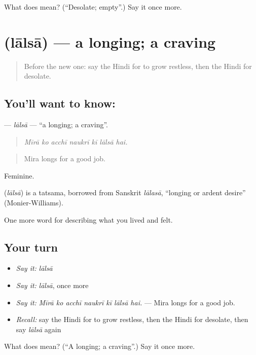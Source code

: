 \begin{tcolorbox}[breakable,colback=teal!4,colframe=teal!35!black,title={Before you move on}]
What does  mean? (\textquotedblleft{}Desolate; empty\textquotedblright{}.) Say it once more.
\end{tcolorbox}
\section[\texorpdfstring{\hi{लालसा} (lālsā)}{लालसा (lālsā)}]{ (lālsā) — a longing; a craving}

\label{lesson:HI-C460-lalsa}



\begin{quote}
Before the new one: say the Hindi for to grow restless, then the Hindi for desolate.
\end{quote}

\subsection*{You'll want to know: }
\textbf{} — \emph{lālsā} — \textquotedblleft{}a longing; a craving\textquotedblright{}.

\begin{quote}
      
\end{quote}

\begin{quote}
\emph{Mīrā ko acchī naukrī kī lālsā hai.}
\end{quote}

\begin{quote}
Mira longs for a good job.
\end{quote}

Feminine.

\begin{cousinweb}
\textbf{} (\emph{lālsā}) is a tatsama, borrowed from Sanskrit \emph{lālasā}, \textquotedblleft{}longing or ardent desire\textquotedblright{} (Monier-Williams).
\end{cousinweb}

\begin{grammarlens}[title={What you've built}]
One more word for describing what you lived and felt.
\end{grammarlens}

\subsection*{Your turn}
\begin{itemize}
\raggedright
  \item \emph{Say it:} \emph{lālsā}
  \item \emph{Say it:} \emph{lālsā}, once more
  \item \emph{Say it:} \emph{Mīrā ko acchī naukrī kī lālsā hai.} — Mira longs for a good job.
  \item \emph{Recall:} say the Hindi for to grow restless, then the Hindi for desolate, then say \emph{lālsā} again
\end{itemize}

\begin{tcolorbox}[breakable,colback=teal!4,colframe=teal!35!black,title={Before you move on}]
What does  mean? (\textquotedblleft{}A longing; a craving\textquotedblright{}.) Say it once more.
\end{tcolorbox}
